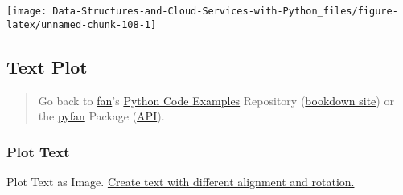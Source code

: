 \documentclass[
]{book}
\begin{document}
\begin{center}\texttt{[image: Data-Structures-and-Cloud-Services-with-Python\_files/figure-latex/unnamed-chunk-108-1]} \end{center}

\hypertarget{text-plot}{%
\subsection{Text Plot}\label{text-plot}}

\begin{quote}
Go back to \href{http://fanwangecon.github.io/}{fan}'s \href{https://fanwangecon.github.io/Py4Econ/}{Python Code Examples} Repository (\href{https://fanwangecon.github.io/Py4Econ/bookdown}{bookdown site}) or the \href{https://pyfan.readthedocs.io/en/latest/}{pyfan} Package (\href{https://pyfan.readthedocs.io/en/latest/reference.html}{API}).
\end{quote}

\hypertarget{plot-text}{%
\subsubsection{Plot Text}\label{plot-text}}

Plot Text as Image. \href{https://matplotlib.org/3.1.1/gallery/pyplots/text_layout.html\#sphx-glr-gallery-pyplots-text-layout-py}{Create text with different alignment and rotation.}
\end{document}
